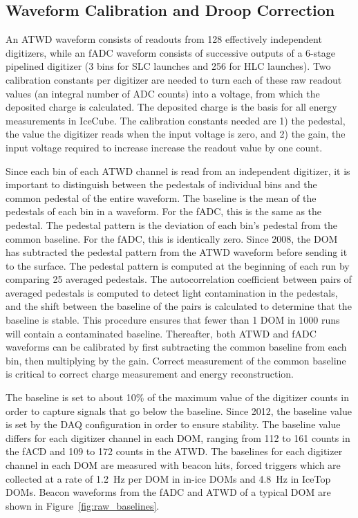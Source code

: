 \subsection{\label{sec:waveformcal} Waveform Calibration and Droop
  Correction}
An ATWD waveform consists of readouts from 128 effectively independent
digitizers, while an fADC waveform consists of successive outputs of a 6-stage
pipelined digitizer (3 bins for SLC launches and 256 for HLC
launches). Two calibration constants per digitizer are needed to turn each of these
raw readout values (an integral number of ADC counts) into a
voltage, from which the deposited charge is calculated. The deposited
charge is the basis for all energy measurements in IceCube. The
calibration constants needed are 1) the pedestal, the value the digitizer reads when the input voltage is zero, and
2) the gain, the input voltage required to increase increase the readout value by one count. 

Since each bin of each ATWD channel is read from an independent
digitizer, it is important to distinguish between the pedestals of
individual bins and the common pedestal of the entire waveform. The
baseline is the mean of the pedestals of each bin in a waveform. For
the fADC, this is the same as the pedestal. The pedestal pattern is
the deviation of each bin's pedestal from the common baseline. For the
fADC, this is identically zero. Since 2008, the DOM has subtracted the
pedestal pattern from
the ATWD waveform before sending it to the surface. The pedestal pattern is computed at the beginning of each
run by comparing 25 averaged pedestals. The autocorrelation coefficient
between pairs of averaged pedestals is computed to detect light
contamination in the pedestals, and the shift between the baseline of
the pairs is calculated to determine that the baseline is stable. This
procedure ensures that fewer than 1 DOM in 1000 runs will contain a
contaminated baseline. Thereafter, both ATWD
and fADC waveforms can be calibrated by first subtracting the common
baseline from each bin, then multiplying by the gain. Correct
measurement of the common baseline is critical to correct charge
measurement and energy reconstruction.

The baseline is set to about 10\% of the maximum value of the
digitizer counts in
order to capture signals that go below the baseline. Since 2012, the
baseline value is set by the DAQ configuration in order to ensure 
stability. The baseline value differs for each digitizer channel in
each DOM, ranging from 112 to 161 counts in the fACD and 109 to 172
counts in the ATWD. The baselines for each digitizer channel in each DOM are measured with
beacon hits, forced triggers which are collected at a rate of 1.2~Hz
per DOM
in in-ice DOMs and 4.8~Hz in IceTop DOMs. Beacon waveforms
from the fADC and ATWD of a typical DOM are shown in Figure~\ref{fig:raw_baselines}.

